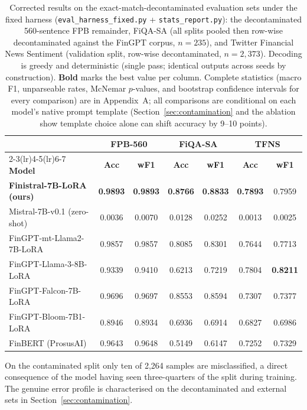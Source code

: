 \documentclass[a4paper]{article}
\begin{document}
\begin{table}[htbp]
\centering
\caption{Corrected results on the exact-match-decontaminated evaluation sets under the fixed harness (\texttt{eval\_harness\_fixed.py} + \texttt{stats\_report.py}): the decontaminated 560-sentence FPB remainder, FiQA-SA (all splits pooled then row-wise decontaminated against the FinGPT corpus, $n{=}235$), and Twitter Financial News Sentiment (validation split, row-wise decontaminated, $n{=}2{,}373$). Decoding is greedy and deterministic (single pass; identical outputs across seeds by construction). \textbf{Bold} marks the best value per column. Complete statistics (macro F1, unparseable rates, McNemar $p$-values, and bootstrap confidence intervals for every comparison) are in Appendix~A; all comparisons are conditional on each model's native prompt template (Section~\ref{sec:contamination} and the ablation show template choice alone can shift accuracy by 9--10 points).}
\label{tab:corrected-results}
\begin{tabular}{lcccccc}
\toprule
 & \multicolumn{2}{c}{\textbf{FPB-560}} & \multicolumn{2}{c}{\textbf{FiQA-SA}} & \multicolumn{2}{c}{\textbf{TFNS}} \\
\cmidrule(lr){2-3}\cmidrule(lr){4-5}\cmidrule(lr){6-7}
\textbf{Model} & \textbf{Acc} & \textbf{wF1} & \textbf{Acc} & \textbf{wF1} & \textbf{Acc} & \textbf{wF1} \\
\midrule
\textbf{Finistral-7B-LoRA (ours)} & \textbf{0.9893} & \textbf{0.9893} & \textbf{0.8766} & \textbf{0.8833} & \textbf{0.7893} & 0.7959 \\
Mistral-7B-v0.1 (zero-shot)       & 0.0036 & 0.0070 & 0.0128 & 0.0252 & 0.0013 & 0.0025 \\
FinGPT-mt-Llama2-7B-LoRA          & 0.9857 & 0.9857 & 0.8085 & 0.8301 & 0.7644 & 0.7713 \\
FinGPT-Llama-3-8B-LoRA            & 0.9339 & 0.9410 & 0.6213 & 0.7219 & 0.7804 & \textbf{0.8211} \\
FinGPT-Falcon-7B-LoRA             & 0.9696 & 0.9697 & 0.8553 & 0.8594 & 0.7307 & 0.7377 \\
FinGPT-Bloom-7B1-LoRA             & 0.8946 & 0.8934 & 0.6936 & 0.6914 & 0.6827 & 0.6986 \\
FinBERT (ProsusAI)                & 0.9643 & 0.9648 & 0.5149 & 0.6147 & 0.7252 & 0.7329 \\
\bottomrule
\end{tabular}
\end{table}

On the contaminated split only ten of 2,264 samples are misclassified, a direct consequence of the model having seen three-quarters of the split during training. The genuine error profile is characterised on the decontaminated and external sets in Section~\ref{sec:contamination}.
\end{document}
